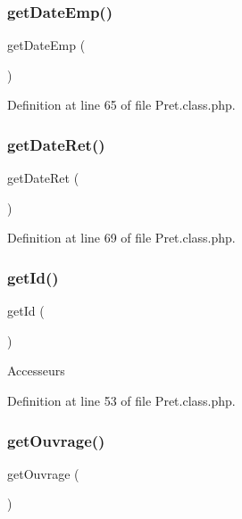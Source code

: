 \mbox{\label{class_pret_afa67d7628b29e3e32469cd070ae19f10}} 
\subsubsection{\texorpdfstring{get\+Date\+Emp()}{getDateEmp()}}
{\footnotesize\ttfamily get\+Date\+Emp (\begin{DoxyParamCaption}{ }\end{DoxyParamCaption})}



Definition at line 65 of file Pret.\+class.\+php.

\mbox{\label{class_pret_a85740f396854605d6a989fac86cabba2}} 
\subsubsection{\texorpdfstring{get\+Date\+Ret()}{getDateRet()}}
{\footnotesize\ttfamily get\+Date\+Ret (\begin{DoxyParamCaption}{ }\end{DoxyParamCaption})}



Definition at line 69 of file Pret.\+class.\+php.

\mbox{\label{class_pret_a12251d0c022e9e21c137a105ff683f13}} 
\subsubsection{\texorpdfstring{get\+Id()}{getId()}}
{\footnotesize\ttfamily get\+Id (\begin{DoxyParamCaption}{ }\end{DoxyParamCaption})}

Accesseurs 

Definition at line 53 of file Pret.\+class.\+php.

\mbox{\label{class_pret_a60362b06c32bb1a659f65d6d54857021}} 
\subsubsection{\texorpdfstring{get\+Ouvrage()}{getOuvrage()}}
{\footnotesize\ttfamily get\+Ouvrage (\begin{DoxyParamCaption}{ }\end{DoxyParamCaption})}



